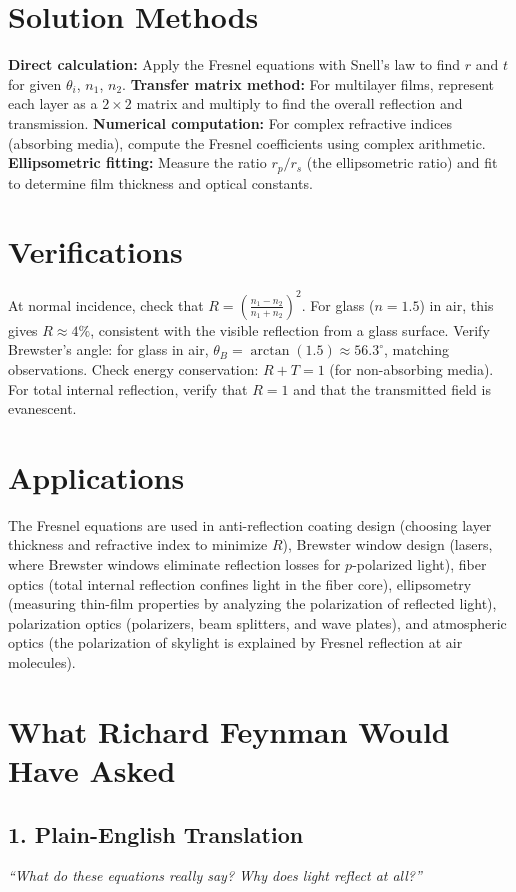 \documentclass[11pt,openright]{book}
\begin{document}
\section*{Solution Methods}

\textbf{Direct calculation:} Apply the Fresnel equations with Snell's law to find $r$ and $t$ for given $\theta_i$, $n_1$, $n_2$. \textbf{Transfer matrix method:} For multilayer films, represent each layer as a $2\times 2$ matrix and multiply to find the overall reflection and transmission. \textbf{Numerical computation:} For complex refractive indices (absorbing media), compute the Fresnel coefficients using complex arithmetic. \textbf{Ellipsometric fitting:} Measure the ratio $r_p/r_s$ (the ellipsometric ratio) and fit to determine film thickness and optical constants.
\section*{Verifications}

At normal incidence, check that $R = \left(\frac{n_1 - n_2}{n_1 + n_2}\right)^2$. For glass ($n = 1.5$) in air, this gives $R \approx 4\%$, consistent with the visible reflection from a glass surface. Verify Brewster's angle: for glass in air, $\theta_B = \arctan(1.5) \approx 56.3^\circ$, matching observations. Check energy conservation: $R + T = 1$ (for non-absorbing media). For total internal reflection, verify that $R = 1$ and that the transmitted field is evanescent.
\section*{Applications}

The Fresnel equations are used in anti-reflection coating design (choosing layer thickness and refractive index to minimize $R$), Brewster window design (lasers, where Brewster windows eliminate reflection losses for $p$-polarized light), fiber optics (total internal reflection confines light in the fiber core), ellipsometry (measuring thin-film properties by analyzing the polarization of reflected light), polarization optics (polarizers, beam splitters, and wave plates), and atmospheric optics (the polarization of skylight is explained by Fresnel reflection at air molecules).
\section*{What Richard Feynman Would Have Asked}

\subsection*{1. Plain-English Translation}
\textit{``What do these equations really say? Why does light reflect at all?''}
\end{document}
